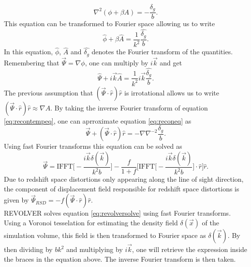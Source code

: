 \begin{equation}
    \nabla^2(\phi+\beta A)=-\frac{\delta_g}{b}.
\end{equation}
This equation can be transformed to Fourier space allowing us to write
\begin{equation}
    \hat{\phi}+\beta\hat{A}=\frac{1}{k^2}\frac{\hat{\delta_g}}{b}.
\end{equation}
In this equation, $\hat{\phi}$, $\hat{A}$ and $\hat{\delta_g}$ denotes the Fourier transform of the quantities.
Remembering that $\vec{\Psi}=\nabla\phi$, one can multiply by $i\vec{k}$ and get
\begin{equation}\label{eq:recontempeq}
    \hat{\Psi}+i\vec{k}\hat{A}=\frac{1}{k^2}i\vec{k}\frac{\hat{\delta_g}}{b}.
\end{equation}
The previous assumption that $(\vec{\Psi}\cdot\hat{r})\hat{r}$ is irrotational
allows us to write $(\vec{\Psi}\cdot\hat{r})\hat{r}\approx\nabla A$. By taking the inverse Fourier transform of equation \ref{eq:recontempeq},
one can aprroximate equation \ref{eq:reconeq} as 
\begin{equation}
    \vec{\Psi}+(\vec{\Psi}\cdot\hat{r})\hat{r}=-\nabla\nabla^{-2}\frac{\delta_g}{b}.
\end{equation}
Using fast Fourier transforms this equation can be solved as \cite{Burden_reconstruction}
\begin{equation}\label{eq:revolversolve}
    \vec{\Psi}=\mathrm{IFFT}\Big[-\frac{i\vec{k}\delta(\vec{k})}{k^2b}\Big]-\frac{f}{1+f}\Big[\mathrm{IFFT}\Big[-\frac{i\vec{k}\delta(\vec{k})}{k^2b}\Big]\cdot\hat{r}\Big]\hat{r}.
\end{equation}
Due to redshift space distortions only appearing along the line of sight direction, the component of displacement field responsible for redshift space distortions is given by $\vec{\Psi}_{RSD}=-f(\vec{\Psi}\cdot\hat{r})\hat{r}$.
\\\indent
REVOLVER solves equation \ref{eq:revolversolve} using fast Fourier transforms.
Using a Voronoi tesselation for estimating the density field $\delta(\vec{x})$ of
the simulation volume, this field is then transformed to Fourier space as
$\delta(\vec{k})$. By then dividing by $bk^2$ and multiplying by $i\vec{k}$, one
will retrieve the expression inside the braces in the equation above. The
inverse Fourier transform is then taken.
